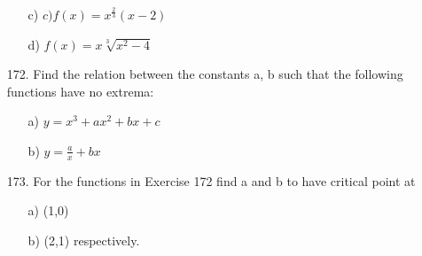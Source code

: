\documentclass{article}
\begin{document}
\begin{itemize}
\begin{itemize}
    \item [c)] $c)f(x) = x^\frac{2}{3}(x-2)$
    \item [d)] $f(x) = x\sqrt[3]{x^2 - 4}$
  \end{itemize}
  \item[172.] Find the relation between the constants a, b such that the following functions have no extrema: 
  \begin{itemize}
    \item[a)] $y=x^3+a x^2 + bx + c $ 
    \item[b)] $y=\frac{a}{x} + bx $
  \end{itemize}
  \item[173.] For the functions in Exercise 172 find  a  and b to have critical point at 
  \begin{itemize}
     \item[a)]  (1,0)
     \item[b)] (2,1) respectively. 
 \end{itemize}
\end{itemize}
\end{document}
